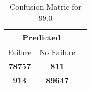 \begin{table}[] 
\caption{Confusion Matric for 99.0} 
\label{Table: Prediction Accuracy-DMD99.0OnlySunEKF-ignoreReflection-Reflection} 
\centering 
\begin{tabular} 
 {@{}ccc@{}} 
\toprule 
\multicolumn{2}{c}{\textbf{Predicted}}
 \\ \midrule 
\multicolumn{1}{|c|}{Failure} & 
\multicolumn{1}{c|}{No Failure}
 \\ \midrule 
\multicolumn{1}{|c|}{\color{green}\textbf{78757}} & 
\multicolumn{1}{c|}{\color{red}\textbf{811}}
 \\ \midrule 
\multicolumn{1}{|c|}{\color{red}\textbf{913}} & 
\multicolumn{1}{c|}{\color{green}\textbf{89647}}
 \\ \bottomrule 
\end{tabular} 
\end{table} 
